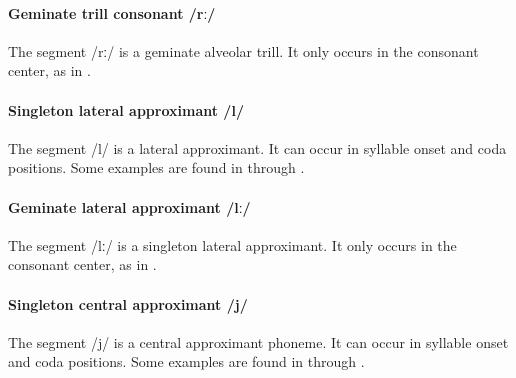\paragraph{Geminate trill consonant /rː/}
The segment /rː/ is a geminate alveolar trill. It only occurs in the consonant center, as in .


\paragraph{Singleton lateral approximant /l/}
The segment /l/ is a lateral approximant. It can occur in syllable onset and coda positions. 
Some examples are found in  through . 

\paragraph{Geminate lateral approximant /lː/}
The segment /lː/ is a singleton lateral approximant. It only occurs in the consonant center, as in .


\paragraph{Singleton central approximant /j/}
The segment /j/ is a central approximant phoneme. It can occur in syllable onset and coda positions. 
Some examples are found in  through . 
%

